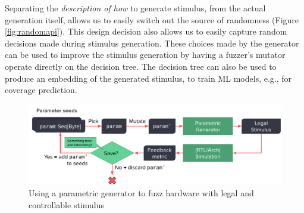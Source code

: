 \documentclass[sigplan,review,nonacm,9pt]{acmart}
\begin{document}
Separating the \textit{description of how} to generate stimulus, from the actual generation itself, allows us to easily switch out the source of randomness (Figure \ref{fig:randomapi}).
This design decision also allows us to easily capture random decisions made during stimulus generation.
These choices made by the generator can be used to improve the stimulus generation by having a fuzzer's mutator operate directly on the decision tree.
The decision tree can also be used to produce an embedding of the generated stimulus, to train ML models, e.g., for coverage prediction.

\begin{figure}
\includegraphics[width=\linewidth]{fuzzing/parametric_fuzzing_hw.pdf}
\caption{Using a parametric generator to fuzz hardware with legal and controllable stimulus}
\label{fig:parametric_fuzzing}
\end{figure}

%
%
\end{document}
